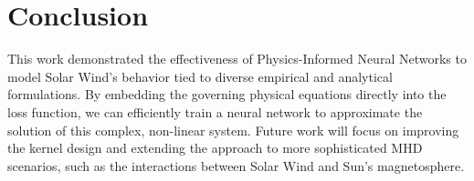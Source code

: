 \documentclass[12pt]{article}
\begin{document}
\section{Conclusion}
This work demonstrated the effectiveness of Physics-Informed Neural Networks to model Solar Wind's behavior tied to diverse empirical and analytical formulations. By embedding the governing physical equations directly into the loss function, we can efficiently train a neural network to approximate the solution of this complex, non-linear system. Future work will focus on improving the kernel design and extending the approach to more sophisticated MHD scenarios, such as the interactions between Solar Wind and Sun's magnetosphere.




\end{document}

